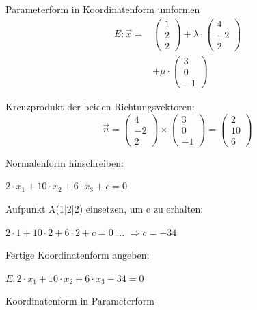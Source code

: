 \documentclass[paper=a6,ngerman,twoside=true,fontsize=14pt, parskip = half]{scrartcl}
\begin{document}
\begin{frage}
	Parameterform in Koordinatenform umformen
	\bigskip
	\begin{align*}
		E:\vec{x}=&\left(\begin{array}{c} 1 \\ 2 \\ 2\end{array} \right)+\lambda \cdot \left(\begin{array}{c} 4 \\ -2 \\ 2\end{array} \right)\\
		&+\mu \cdot \left(\begin{array}{c} 3 \\0 \\ -1\end{array} \right)
	\end{align*}
\end{frage}
\begin{antwort}
	Kreuzprodukt der beiden Richtungsvektoren:
	\begin{equation*}
	\vec{n}=\left(\begin{array}{c} 4 \\ -2 \\ 2\end{array} \right) \times \left(\begin{array}{c} 3 \\0 \\ -1\end{array} \right) 
	=\left(\begin{array}{c} 2 \\10 \\ 6\end{array} \right)
	\end{equation*}
		
	Normalenform hinschreiben: 
		
		$2 \cdot x_1 + 10 \cdot x_2+6 \cdot x_3 + c = 0$
		
	Aufpunkt A(1|2|2) einsetzen, um c zu erhalten: 
		
		$2 \cdot 1 + 10 \cdot 2+6 \cdot 2 + c = 0$
		... $\Rightarrow c = -34$
		
	Fertige Koordinatenform angeben: 
		
		$E: 2 \cdot x_1 + 10 \cdot x_2+6 \cdot x_3  -34 = 0$
			
	
\end{antwort}
\begin{frage}
	Koordinatenform in Parameterform
	
\end{frage}
\end{document}
